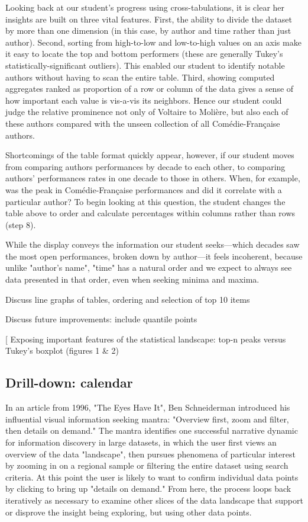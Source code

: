\documentclass[	DIV=calc,%
							paper=a4,%
							fontsize=11pt,%
							twocolumn]{scrartcl}	 					%
\begin{document}
Looking back at our student’s progress using cross-tabulations, it is clear her insights are built on three vital features.  First, the ability to divide the dataset by more than one dimension (in this case, by author and time rather than just author).  Second, sorting from high-to-low and low-to-high values on an axis make it easy to locate the top and bottom performers (these are generally Tukey’s statistically-significant outliers).  This enabled our student to identify notable authors without having to scan the entire table. Third, showing computed aggregates ranked as proportion of a row or column of the data gives a sense of how important each value is vis-a-vis its neighbors.  Hence our student could judge the relative prominence not only of Voltaire to Molière, but also each of these authors compared with the unseen collection of all Comédie-Française authors.

Shortcomings of the table format quickly appear, however, if our student moves from comparing authors performances by decade to each other, to comparing authors’ performances rates in one decade to those in others.  When, for example, was the peak in Comédie-Française performances and did it correlate with a particular author?  To begin looking at this question, the student changes the table above to order and calculate percentages within columns rather than rows (step 8).

While the display conveys the information our student seeks—which decades saw the most open performances, broken down by author—it feels incoherent, because unlike "author’s name", "time" has a natural order and we expect to always see data presented in that order, even when seeking minima and maxima.

Discuss line graphs of tables, ordering and selection of top 10 items

Discuss future improvements:  include quantile points


[ Exposing important features of the statistical landscape: top-n peaks versus Tukey’s boxplot (figures 1 \& 2)

\subsection*{Drill-down: calendar}

In an article from 1996, "The Eyes Have It", Ben Schneiderman introduced his influential visual information seeking mantra: "Overview first, zoom and filter, then details on demand."\cite{Shneiderman:1996}  The mantra identifies one successful narrative dynamic for information discovery in large datasets, in which the user first views an overview of the data "landscape", then pursues phenomena of particular interest by zooming in on a regional sample or filtering the entire dataset using search criteria.  At this point the user is likely to want to confirm individual data points by clicking to bring up "details on demand."  From here, the process loops back iteratively as necessary to examine other slices of the data landscape that support or disprove the insight being exploring, but using other data points.
\end{document}
